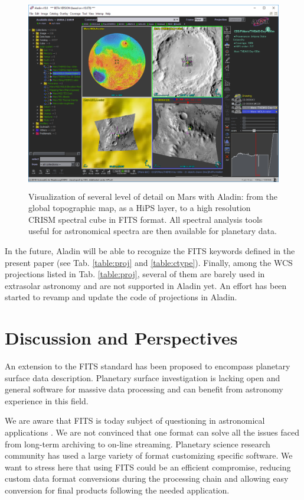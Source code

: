 \begin{figure}[ht!]
\centerline{\includegraphics[height=20pc]{ess_marmo6}}
\caption{Visualization of several level of detail on Mars with Aladin: from the
global topographic map, as a HiPS layer, to a high resolution CRISM spectral cube
in FITS format. All spectral analysis tools useful for astronomical spectra
are then available for planetary data.}
\label{fig:aladin}
\end{figure}

In the future, Aladin will be able to recognize the FITS keywords defined
in the present paper (see Tab. \ref{table:proj} and \ref{table:ctype}).
Finally, among the WCS projections listed in Tab. \ref{table:proj}, several of
them are barely used in extrasolar astronomy and are not supported in Aladin yet.
An effort has been started to revamp and update the code of projections in
Aladin.

\section{Discussion and Perspectives}
\label{sec:disc}
An extension to the FITS standard has been proposed to encompass planetary
surface data description.
Planetary surface investigation is lacking open and general software for massive data
processing and can benefit from astronomy experience in this field.

We are aware that FITS is today subject of questioning in astronomical applications
\citep{THOMAS2015133}.
We are not convinced that one format can solve all the issues faced from long-term
archiving to on-line streaming.
Planetary science research community has used a large variety of format customizing
specific software.
We want to stress here that using FITS could be an efficient compromise, reducing custom
data format conversions during the processing chain and
allowing easy conversion for final products following the needed application.


